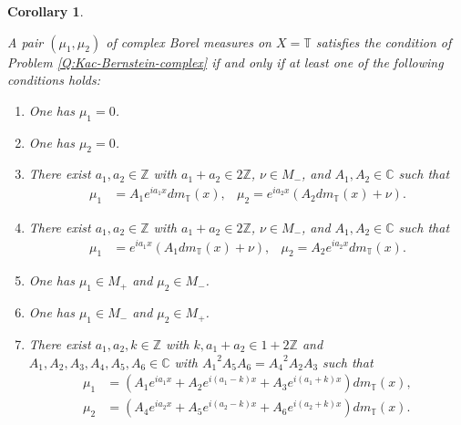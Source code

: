 \documentclass[12pt]{article}
\newtheorem{corollary}[theorem]{Corollary}
\theoremstyle{definition}
\theoremstyle{remark}
\numberwithin{equation}{section}
\numberwithin{figure}{section}
\numberwithin{table}{section}
\begin{document}
\begin{corollary}
      \label{cor:complex-T}

A pair $ ( \mu_1 , \mu_2 ) $ of complex Borel measures on $ X = \mathbb{ T } $ satisfies the condition of Problem \ref{Q:Kac-Bernstein-complex} if and only if at least one of the following conditions holds:

\begin{enumerate}
  \item \label{item:complex-T-f1-zero}
  
  One has $ \mu_1 = 0 $.

  \item \label{item:complex-T-f2-zero}
  
  One has $ \mu_2 = 0 $.

\item \label{item:complex-T-f1-one-point}

There exist $ a_1 , a_2 \in \mathbb{ Z } $ with $ a_1 + a_2 \in 2 \mathbb{ Z } $, $ \nu \in M_- $, and $ A_1 , A_2 \in \mathbb{ C } $ such that
\begin{align}
    \mu_1 & = A_1 e^{ i a_1 x } dm_{ \mathbb{ T } } (x), & \mu_2 = e^{ i a_2 x } ( A_2 dm_{ \mathbb{ T } } ( x ) + \nu ).
\end{align}

\item \label{item:complex-T-f2-one-point}

There exist $ a_1 , a_2 \in \mathbb{ Z } $ with $ a_1 + a_2 \in 2 \mathbb{ Z } $, $ \nu \in M_- $, and $ A_1 , A_2 \in \mathbb{ C } $ such that
\begin{align}
    \mu_1 & = e^{ i a_1 x } ( A_1 dm_{ \mathbb{ T } } (x) + \nu ), & \mu_2 = A_2 e^{ i a_2 x } dm_{ \mathbb{ T } } ( x ).
\end{align}

\item \label{item:complex-T-independent-1-even}
One has $ \mu_1 \in M_+ $ and $ \mu_2 \in M_- $.

\item \label{item:complex-T-independent-1-odd}
One has $ \mu_1 \in M_- $ and $ \mu_2 \in M_+ $.

\item \label{item:complex-T-six-point}

There exist $ a_1 , a_2 , k \in \mathbb{ Z } $ with $ k , a_1 + a_2 \in 1 + 2 \mathbb{ Z } $ and $ A_1 , A_2 , A_3 , A_4 , A_5 , A_6 \in \mathbb{ C } $ with $ {A_1}^2 A_5 A_6 = {A_4}^2 A_2 A_3 $ such that
\begin{align}
    \mu_1 & = ( A_1 e^{ i a_1 x } + A_2 e^{ i ( a_1 - k ) x } + A_3 e^{ i ( a_1 + k ) x } ) dm_{ \mathbb{ T } }  ( x ), \\
    \mu_2 & = ( A_4 e^{ i  a_2 x } + A_5 e^{ i ( a_2 - k ) x } + A_6 e^{ i ( a_2 + k ) x } ) dm_{ \mathbb{ T } }  ( x ).
\end{align}


\end{enumerate}
\end{corollary}
\end{document}
